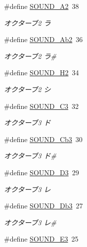 \begin{DoxyCompactItemize}
\#define \hyperlink{sound_8h_a87cc8e430711a16f8d53adec0fc30863_a87cc8e430711a16f8d53adec0fc30863}{S\+O\+U\+N\+D\+\_\+\+A2}~38
\begin{DoxyCompactList}\small\item\em オクターブ2 ラ \end{DoxyCompactList}\item 
\#define \hyperlink{sound_8h_aa355b76cc29205f9fdd6edd04802baa1_aa355b76cc29205f9fdd6edd04802baa1}{S\+O\+U\+N\+D\+\_\+\+Ab2}~36
\begin{DoxyCompactList}\small\item\em オクターブ2 ラ\# \end{DoxyCompactList}\item 
\#define \hyperlink{sound_8h_a8aeeeb1a420c4f8b23fe5c7960045a06_a8aeeeb1a420c4f8b23fe5c7960045a06}{S\+O\+U\+N\+D\+\_\+\+H2}~34
\begin{DoxyCompactList}\small\item\em オクターブ2 シ \end{DoxyCompactList}\item 
\#define \hyperlink{sound_8h_a6cb42a0945d4a26b716ea357b265a8e4_a6cb42a0945d4a26b716ea357b265a8e4}{S\+O\+U\+N\+D\+\_\+\+C3}~32
\begin{DoxyCompactList}\small\item\em オクターブ3 ド \end{DoxyCompactList}\item 
\#define \hyperlink{sound_8h_a3fbca825ab7829e2da07997cfb7be2b5_a3fbca825ab7829e2da07997cfb7be2b5}{S\+O\+U\+N\+D\+\_\+\+Cb3}~30
\begin{DoxyCompactList}\small\item\em オクターブ3 ド\# \end{DoxyCompactList}\item 
\#define \hyperlink{sound_8h_ab0ffa43b4f3def70d822938a28983c90_ab0ffa43b4f3def70d822938a28983c90}{S\+O\+U\+N\+D\+\_\+\+D3}~29
\begin{DoxyCompactList}\small\item\em オクターブ3 レ \end{DoxyCompactList}\item 
\#define \hyperlink{sound_8h_a1cfd87bf68ec505eec2f20f710ce0189_a1cfd87bf68ec505eec2f20f710ce0189}{S\+O\+U\+N\+D\+\_\+\+Db3}~27
\begin{DoxyCompactList}\small\item\em オクターブ3 レ\# \end{DoxyCompactList}\item 
\#define \hyperlink{sound_8h_a7c3d885a2a78b0ac306c3d275233e037_a7c3d885a2a78b0ac306c3d275233e037}{S\+O\+U\+N\+D\+\_\+\+E3}~25

\end{DoxyCompactItemize}
